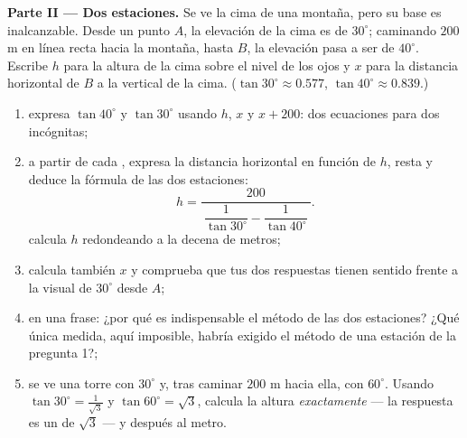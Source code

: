 \begin{problem}
\medskip
\noindent\textbf{Parte II --- Dos estaciones.}
Se ve la cima de una montaña, pero su base es inalcanzable. Desde un
punto $A$, la elevación de la cima es de $30^\circ$; caminando $200$ m
en línea recta hacia la montaña, hasta $B$, la elevación pasa a ser de
$40^\circ$. Escribe $h$ para la altura de la cima sobre el nivel de los ojos
y $x$ para la distancia horizontal de $B$ a la vertical de
la cima. ($\tan 30^\circ \approx 0.577$,
$\tan 40^\circ \approx 0.839$.)
\begin{enumerate}[resume]
  \item expresa $\tan 40^\circ$ y $\tan 30^\circ$ usando $h$,
        $x$ y $x + 200$: dos ecuaciones para dos incógnitas;
  \item a partir de cada , expresa la distancia horizontal en
        función de $h$, resta y deduce la fórmula de las dos
        estaciones:
        \[
        h = \frac{200}
        {\ \dfrac{1}{\tan 30^\circ} - \dfrac{1}{\tan 40^\circ}\ } .
        \]
        calcula $h$ redondeando a la decena de metros;
  \item calcula también $x$ y comprueba que tus dos respuestas
        tienen sentido frente a la visual de $30^\circ$ desde $A$;
  \item en una frase: ¿por qué es indispensable el método de las dos
        estaciones? ¿Qué única medida, aquí imposible,
        habría exigido el método de una estación de la pregunta 1?;
  \item se ve una torre con $30^\circ$ y, tras caminar $200$ m
        hacia ella, con $60^\circ$. Usando
        $\tan 30^\circ = \frac{1}{\sqrt3}$ y
        $\tan 60^\circ = \sqrt3$, calcula la altura
        \emph{exactamente} --- la respuesta es un
         de $\sqrt3$ --- y después
        al metro.
\end{enumerate}


\end{problem}
